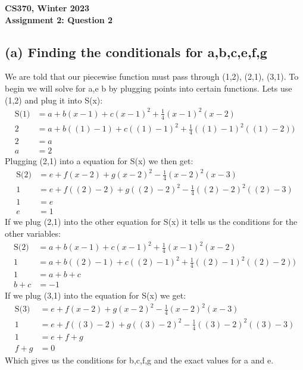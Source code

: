 \documentclass[12pt]{article}
\begin{document}
\begin{center}
{\Large\textbf{CS370, Winter 2023}}\\
\vspace{2mm}
{\Large\textbf{Assignment 2: Question 2}}\\
\vspace{3mm}
\end{center}

\begin{adjustwidth}{0em}{0pt}

\section*{(a) Finding the conditionals for a,b,c,e,f,g}
We are told that our piecewise function must pass through (1,2), (2,1), (3,1). To begin we will solve for a,e b by plugging points into certain functions. Lets use (1,2) and plug it into S(x):
\begin{align*}
   \text{S(1)} &= a + b(x-1) + c(x-1)^2 + \frac{1}{4}(x-1)^2(x-2) \\
             2 &= a + b((1)-1) + c((1)-1)^2 + \frac{1}{4}((1)-1)^2((1)-2)) \\
             2 &= a \\
             a &= 2 
\end{align*}
Plugging (2,1) into a equation for S(x) we then get:
\begin{align*}
   \text{S(2)} &= e + f(x-2) + g(x-2)^2 - \frac{1}{4}(x-2)^2(x-3) \\
             1 &= e + f((2)-2) + g((2)-2)^2 - \frac{1}{4}((2)-2)^2((2)-3) \\
             1 &= e \\
             e &= 1 
\end{align*}
If we plug (2,1) into the other equation for S(x) it tells us the conditions for the other variables:
\begin{align*}
   \text{S(2)} &= a + b(x-1) + c(x-1)^2 + \frac{1}{4}(x-1)^2(x-2) \\
             1 &= a + b((2)-1) + c((2)-1)^2 + \frac{1}{4}((2)-1)^2((2)-2)) \\
             1 &= a + b + c \\
             b + c &= -1
\end{align*}
If we plug (3,1) into the equation for S(x) we get:
\begin{align*}
   \text{S(3)} &= e + f(x-2) + g(x-2)^2 - \frac{1}{4}(x-2)^2(x-3) \\
             1 &= e + f((3)-2) + g((3)-2)^2 - \frac{1}{4}((3)-2)^2((3)-3) \\
             1 &= e + f + g \\
             f + g &= 0
\end{align*}
Which gives us the conditions for b,c,f,g and the exact values for a and e.

\end{adjustwidth}
\end{document}
